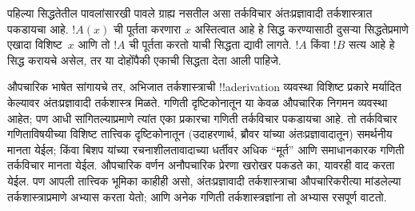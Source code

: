 \documentclass[../../../include/open-logic-chapter]{subfiles}
\begin{document}
पहिल्या सिद्धतेतील पावलांसारखी पावले ग्राह्य नसतील
असा तर्कविचार अंतःप्रज्ञावादी तर्कशास्त्रात पकडायचा
आहे. $!A(x)$ ची पूर्तता करणारा $x$ अस्तित्वात आहे
हे सिद्ध करण्यासाठी दुसऱ्या सिद्धतेप्रमाणे एखादा
विशिष्ट~$x$ आणि तो $!A$ ची पूर्तता करतो याची
सिद्धता द्यावी लागते. $!A$ किंवा $!B$ सत्य आहे
हे सिद्ध करायचे असेल, तर या दोहोंपैकी एकाची
सिद्धता देता आली पाहिजे.

औपचारिक भाषेत सांगायचे तर, अभिजात तर्कशास्त्राची
!!a{derivation} व्यवस्था विशिष्ट प्रकारे मर्यादित
केल्यावर अंतःप्रज्ञावादी तर्कशास्त्र मिळते. गणिती
दृष्टिकोनातून या केवळ औपचारिक निगमन व्यवस्था
आहेत; पण आधी सांगितल्याप्रमाणे त्यांत एका प्रकारचा
गणिती तर्कविचार पकडायचा आहे. तो तर्कविचार
गणिताविषयीच्या विशिष्ट तात्त्विक दृष्टिकोनातून
(उदाहरणार्थ, ब्रौवर यांच्या अंतःप्रज्ञावादातून)
समर्थनीय मानता येईल; किंवा बिशप यांच्या
रचनाशीलतावादाच्या धर्तीवर अधिक ``मूर्त'' आणि
समाधानकारक गणिती तर्कविचार मानता येईल. औपचारिक
वर्णन अनौपचारिक प्रेरणा खरोखर पकडते का, यावरही
वाद करता येईल. पण आपली तात्त्विक भूमिका काहीही
असो, अंतःप्रज्ञावादी तर्कशास्त्राचा औपचारिकरीत्या
मांडलेल्या तर्कशास्त्राप्रमाणे अभ्यास करता येतो;
आणि अनेक गणिती तर्कशास्त्रज्ञांना तो अभ्यास
रसपूर्ण वाटतो.
\end{document}
